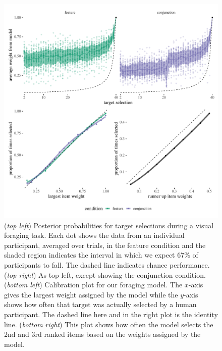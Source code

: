 \documentclass[preprints, article,submit,pdftex,moreauthors]{Definitions/mdpi}
\begin{document}
\begin{figure}[H]
\centering
\includegraphics[width=12 cm]{Figures/qjep_preds.pdf}
\caption{(\textit{top left}) Posterior probabilities for target selections during a visual foraging task. Each dot shows the data from an individual participant, averaged over trials, in the feature condition and the shaded region indicates the interval in which we expect 67\% of participants to fall. The dashed line indicates chance performance. (\textit{top right}) As top left, except showing the conjunction condition. (\textit{bottom left})  Calibration plot for our foraging model. The $x$-axis gives the largest weight assigned by the model while the $y$-axis shows how often that target was actually selected by a human participant. The dashed line here and in the right plot is the identity line. (\textit{bottom right}) This plot shows how often the model selects the 2nd and 3rd ranked items based on the weights assigned by the model.}
\label{fig:cal}
\end{figure}   
\end{document}
